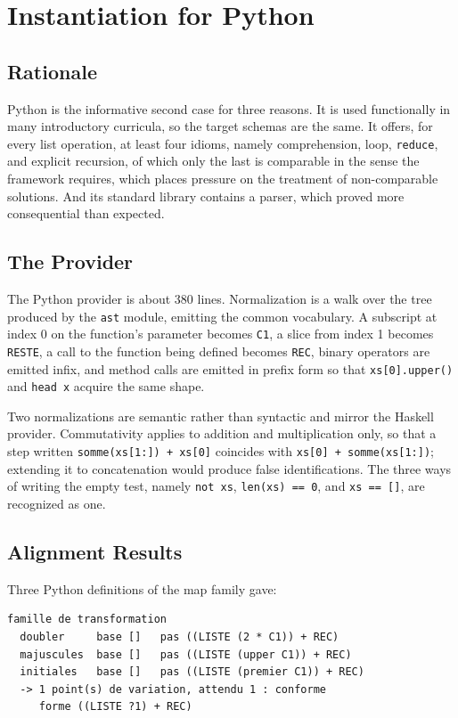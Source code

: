 \documentclass[journal]{IEEEtran}
\begin{document}
\section{Instantiation for Python}\label{sec:5}
\subsection{Rationale}\label{sec:5.1}
Python is the informative second case for three reasons. It is used
functionally in many introductory curricula, so the target schemas are
the same. It offers, for every list operation, at least four idioms,
namely comprehension, loop, \texttt{reduce}, and explicit recursion, of
which only the last is comparable in the sense the framework requires,
which places pressure on the treatment of non-comparable solutions. And
its standard library contains a parser, which proved more consequential
than expected.

\subsection{The Provider}\label{sec:5.2}
The Python provider is about 380 lines. Normalization is a walk over the tree
produced by the \texttt{ast} module, emitting the common vocabulary. A
subscript at index 0 on the function's parameter becomes \texttt{C1}, a
slice from index 1 becomes \texttt{RESTE}, a call to the function being
defined becomes \texttt{REC}, binary operators are emitted infix, and
method calls are emitted in prefix form so that
\texttt{xs[0].upper()} and \texttt{head x} acquire the same shape.

Two normalizations are semantic rather than syntactic and mirror the
Haskell provider. Commutativity applies to addition and multiplication
only, so that a step written \texttt{somme(xs[1:]) + xs[0]}
coincides with \texttt{xs[0] + somme(xs[1:])}; extending it to
concatenation would produce false identifications. The three ways of
writing the empty test, namely \texttt{not xs},
\texttt{len(xs) == 0}, and \texttt{xs == []}, are recognized as
one.

\subsection{Alignment Results}\label{sec:5.3}
Three Python definitions of the map family gave:
\begin{samepage}\noindent\begin{minipage}{\linewidth}
\begin{verbatim}
famille de transformation
  doubler     base []   pas ((LISTE (2 * C1)) + REC)
  majuscules  base []   pas ((LISTE (upper C1)) + REC)
  initiales   base []   pas ((LISTE (premier C1)) + REC)
  -> 1 point(s) de variation, attendu 1 : conforme
     forme ((LISTE ?1) + REC)
\end{verbatim}
\end{minipage}\end{samepage}
\end{document}
